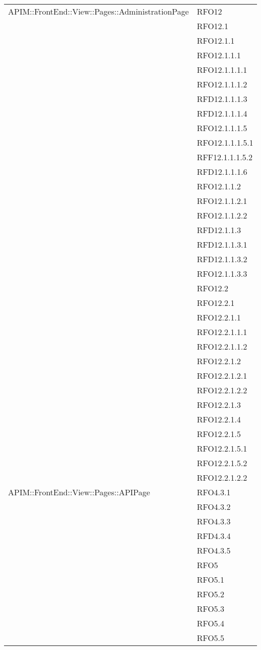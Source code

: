 \begin{longtable}{ p{12cm} | p{4cm} }
			\hline
			APIM::FrontEnd::View::Pages::AdministrationPage
			&RFO12\\
			&RFO12.1\\
			&RFO12.1.1\\
			&RFO12.1.1.1\\
			&RFO12.1.1.1.1\\
			&RFO12.1.1.1.2\\
			&RFD12.1.1.1.3\\
			&RFD12.1.1.1.4\\
			&RFO12.1.1.1.5\\
			&RFO12.1.1.1.5.1\\
			&RFF12.1.1.1.5.2\\
			&RFD12.1.1.1.6\\
			&RFO12.1.1.2\\
			&RFO12.1.1.2.1\\
			&RFO12.1.1.2.2\\
			&RFD12.1.1.3\\
			&RFD12.1.1.3.1\\
			&RFD12.1.1.3.2\\
			&RFO12.1.1.3.3\\
			&RFO12.2\\
			&RFO12.2.1\\
			&RFO12.2.1.1\\
			&RFO12.2.1.1.1\\
			&RFO12.2.1.1.2\\
			&RFO12.2.1.2\\
			&RFO12.2.1.2.1\\
			&RFO12.2.1.2.2\\
			&RFO12.2.1.3\\
			&RFO12.2.1.4\\
			&RFO12.2.1.5\\
			&RFO12.2.1.5.1\\
			&RFO12.2.1.5.2\\
			&RFO12.2.1.2.2\\
			\hline
			APIM::FrontEnd::View::Pages::APIPage
			&RFO4.3.1\\
			&RFO4.3.2\\
			&RFO4.3.3\\
			&RFD4.3.4\\
			&RFO4.3.5\\
			&RFO5\\
			&RFO5.1\\
			&RFO5.2\\
			&RFO5.3\\
			&RFO5.4\\
			&RFO5.5\\

\end{longtable}
